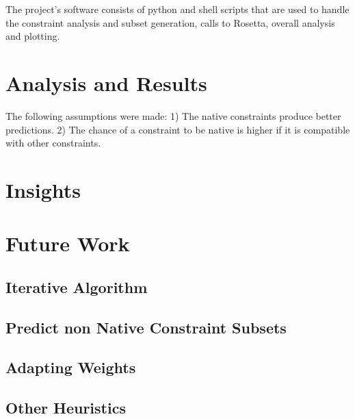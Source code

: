 \documentclass[a4paper, 11pt, parskip=half]{scrartcl}
\begin{document}
The project's software consists of python and shell scripts that are used to
handle the constraint analysis and subset generation,
calls to Rosetta, overall analysis and plotting.

\section{Analysis and Results}
The following assumptions were made:
1) The native constraints produce better predictions.
2) The chance of a constraint to be native is higher if it is compatible
with other constraints.

\section{Insights}

\section{Future Work}

\subsection{Iterative Algorithm}

\subsection{Predict non Native Constraint Subsets}

\subsection{Adapting Weights}

\subsection{Other Heuristics}
\end{document}
